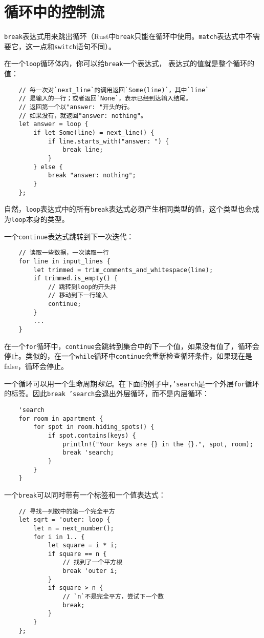 \section{循环中的控制流}

\texttt{break}表达式用来跳出循环（Rust中\texttt{break}只能在循环中使用。\texttt{match}表达式中不需要它，这一点和\texttt{switch}语句不同）。

在一个\texttt{loop}循环体内，你可以给\texttt{break}一个表达式，
表达式的值就是整个循环的值：
\begin{verbatim}
    // 每一次对`next_line`的调用返回`Some(line)`，其中`line`
    // 是输入的一行；或者返回`None`，表示已经到达输入结尾。
    // 返回第一个以"answer: "开头的行。
    // 如果没有，就返回"answer: nothing"。
    let answer = loop {
        if let Some(line) = next_line() {
            if line.starts_with("answer: ") {
                break line;
            }
        } else {
            break "answer: nothing";
        }
    };
\end{verbatim}

自然，\texttt{loop}表达式中的所有\texttt{break}表达式必须产生相同类型的值，这个类型也会成为\texttt{loop}本身的类型。

一个\texttt{continue}表达式跳转到下一次迭代：
\begin{verbatim}
    // 读取一些数据，一次读取一行
    for line in input_lines {
        let trimmed = trim_comments_and_whitespace(line);
        if trimmed.is_empty() {
            // 跳转到loop的开头并
            // 移动到下一行输入
            continue;
        }
        ...
    }
\end{verbatim}

在一个\texttt{for}循环中，\texttt{continue}会跳转到集合中的下一个值，如果没有值了，循环会停止。类似的，在一个\texttt{while}循环中\texttt{continue}会重新检查循环条件，如果现在是false，循环会停止。

一个循环可以用一个生命周期\emph{标记}。在下面的例子中，\texttt{'search}是一个外层\texttt{for}循环的标签。因此\texttt{break 'search}会退出外层循环，而不是内层循环：
\begin{verbatim}
    'search
    for room in apartment {
        for spot in room.hiding_spots() {
            if spot.contains(keys) {
                println!("Your keys are {} in the {}.", spot, room);
                break 'search;
            }
        }
    }
\end{verbatim}

一个\texttt{break}可以同时带有一个标签和一个值表达式：
\begin{verbatim}
    // 寻找一列数中的第一个完全平方
    let sqrt = 'outer: loop {
        let n = next_number();
        for i in 1.. {
            let square = i * i;
            if square == n {
                // 找到了一个平方根
                break 'outer i;
            }
            if square > n {
                // `n`不是完全平方，尝试下一个数
                break;
            }
        }
    };
\end{verbatim}

